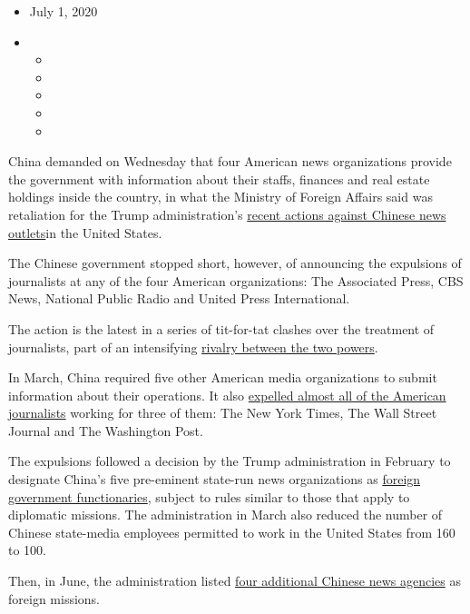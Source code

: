 \begin{itemize}
\item
  July 1, 2020
\item
  \begin{itemize}
  \item
  \item
  \item
  \item
  \item
  \end{itemize}
\end{itemize}

China demanded on Wednesday that four American news organizations
provide the government with information about their staffs, finances and
real estate holdings inside the country, in what the Ministry of Foreign
Affairs said was retaliation for the Trump administration's
\href{https://www.nytimes.com/2020/06/22/us/politics/us-china-news-organizations.html}{recent
actions against Chinese news outlets}in the United States.

The Chinese government stopped short, however, of announcing the
expulsions of journalists at any of the four American organizations: The
Associated Press, CBS News, National Public Radio and United Press
International.

The action is the latest in a series of tit-for-tat clashes over the
treatment of journalists, part of an intensifying
\href{https://www.nytimes.com/2020/07/23/world/asia/us-china-consulate.html}{rivalry
between the two powers}.

In March, China required five other American media organizations to
submit information about their operations. It also
\href{https://www.nytimes.com/2020/03/17/business/media/china-expels-american-journalists.html}{expelled
almost all of the American journalists} working for three of them: The
New York Times, The Wall Street Journal and The Washington Post.

The expulsions followed a decision by the Trump administration in
February to designate China's five pre-eminent state-run news
organizations as
\href{https://www.nytimes.com/2020/02/18/world/asia/china-media-trump.html}{foreign
government functionaries}, subject to rules similar to those that apply
to diplomatic missions. The administration in March also reduced the
number of Chinese state-media employees permitted to work in the United
States from 160 to 100.

Then, in June, the administration listed
\href{https://www.nytimes.com/2020/06/22/us/politics/us-china-news-organizations.html}{four
additional Chinese news agencies} as foreign missions.

